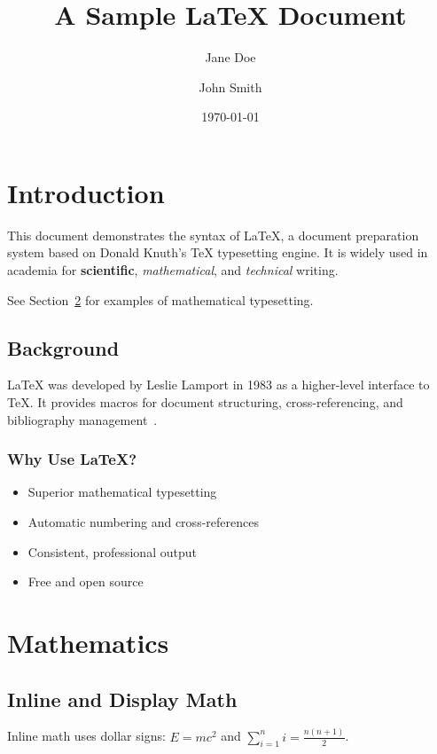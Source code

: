 \documentclass[12pt,a4paper]{article}
\title{A Sample \LaTeX{} Document}
\author{Jane Doe \and John Smith}
\date{\today}
\begin{document}
\maketitle

\tableofcontents
\newpage

\section{Introduction}
\label{sec:intro}

This document demonstrates the syntax of \LaTeX{}, a document preparation system
based on Donald Knuth's \TeX{} typesetting engine. It is widely used in academia
for \textbf{scientific}, \textit{mathematical}, and \emph{technical} writing.

See Section~\ref{sec:math} for examples of mathematical typesetting.

\subsection{Background}
\label{sec:background}

\LaTeX{} was developed by Leslie Lamport in 1983 as a higher-level interface to
\TeX{}. It provides macros for document structuring, cross-referencing, and
bibliography management~\cite{lamport1994latex}.

\subsubsection{Why Use \LaTeX{}?}
\begin{itemize}
  \item Superior mathematical typesetting
  \item Automatic numbering and cross-references
  \item Consistent, professional output
  \item Free and open source
\end{itemize}

\section{Mathematics}
\label{sec:math}

\subsection{Inline and Display Math}

Inline math uses dollar signs: $E = mc^2$ and $\sum_{i=1}^{n} i = \frac{n(n+1)}{2}$.
\end{document}
